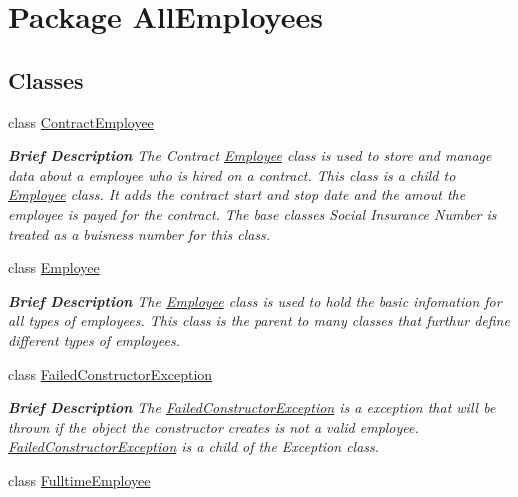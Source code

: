 \hypertarget{namespace_all_employees}{}\section{Package All\+Employees}
\label{namespace_all_employees}
\subsection*{Classes}
\begin{DoxyCompactItemize}
\item 
class \hyperlink{class_all_employees_1_1_contract_employee}{Contract\+Employee}
\begin{DoxyCompactList}\small\item\em {\bfseries Brief Description} The Contract \hyperlink{class_all_employees_1_1_employee}{Employee} class is used to store and manage data about a employee who is hired on a contract. This class is a child to \hyperlink{class_all_employees_1_1_employee}{Employee} class. It adds the contract start and stop date and the amout the employee is payed for the contract. The base classes Social Insurance Number is treated as a buisness number for this class. \end{DoxyCompactList}\item 
class \hyperlink{class_all_employees_1_1_employee}{Employee}
\begin{DoxyCompactList}\small\item\em {\bfseries Brief Description} The \hyperlink{class_all_employees_1_1_employee}{Employee} class is used to hold the basic infomation for all types of employees. This class is the parent to many classes that furthur define different types of employees. \end{DoxyCompactList}\item 
class \hyperlink{class_all_employees_1_1_failed_constructor_exception}{Failed\+Constructor\+Exception}
\begin{DoxyCompactList}\small\item\em {\bfseries Brief Description} The \hyperlink{class_all_employees_1_1_failed_constructor_exception}{Failed\+Constructor\+Exception} is a exception that will be thrown if the object the constructor creates is not a valid employee. \hyperlink{class_all_employees_1_1_failed_constructor_exception}{Failed\+Constructor\+Exception} is a child of the Exception class. \end{DoxyCompactList}\item 
class \hyperlink{class_all_employees_1_1_fulltime_employee}{Fulltime\+Employee}

\end{DoxyCompactItemize}
